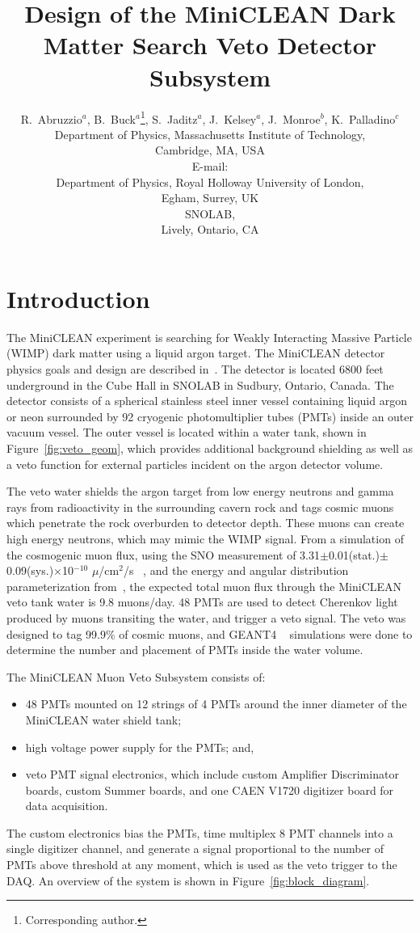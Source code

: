 \documentclass{JINST}
\title{Design of the MiniCLEAN Dark Matter Search Veto Detector Subsystem}
\author{R.~Abruzzio$^a$, B.~Buck$^a$\thanks{Corresponding author.}, S.~Jaditz$^a$, J.~Kelsey$^a$, J.~Monroe$^{b}$, K.~Palladino$^{c}$\\
\llap{$^a$}Department of Physics, Massachusetts Institute of Technology,\\
	Cambridge, MA, USA\\
	E-mail: \email{bbuck@mit.edu}\\
\llap{$^b$}Department of Physics, Royal Holloway University of London,\\
	Egham, Surrey, UK \\
\llap{$^c$}SNOLAB, \\ 
        Lively, Ontario, CA}
\begin{document}
\section{Introduction}
\label{Introduction}
The MiniCLEAN experiment is searching for Weakly Interacting Massive Particle
(WIMP) dark matter using a liquid argon target.  The MiniCLEAN detector
physics goals and design are described in~\cite{ref:miniclean_physics}.  The
detector is located 6800 feet underground in the Cube Hall in SNOLAB in
Sudbury, Ontario, Canada.  The detector consists of a spherical stainless
steel inner vessel containing liquid argon or neon surrounded by 92 cryogenic
photomultiplier tubes (PMTs) inside an outer vacuum vessel. The outer vessel
is located within a water tank, shown in Figure~\ref{fig:veto_geom}, which
provides additional background shielding as well as a veto function for
external particles incident on the argon detector volume.  

The veto water shields the argon target from low energy neutrons and gamma
rays from radioactivity in the surrounding cavern rock and tags cosmic muons
which penetrate the rock overburden to detector depth.  These muons can
create high energy neutrons, which may mimic the WIMP signal.
From a simulation of the cosmogenic muon flux, using the SNO measurement of
3.31$\pm$0.01(stat.)$\pm$0.09(sys.)$\times$10$^{-10}$ $\mu$/cm$^2$/s
~\cite{ref:sno_muon_flux}, and the energy and angular distribution
parameterization from~\cite{ref:mei_and_hime}, the expected total muon flux
through the MiniCLEAN veto tank water is 9.8 muons/day.  48 PMTs are used to
detect Cherenkov light produced by muons transiting the water, and trigger a
veto signal.  The veto was designed to tag 99.9\% of cosmic muons, and GEANT4
~\cite{ref:geant4} simulations were done to determine the number and placement
of PMTs inside the water volume.  

The MiniCLEAN Muon Veto Subsystem consists of:
\begin{itemize}
\item 48 PMTs mounted on 12 strings of 4 PMTs around the inner diameter of the MiniCLEAN water shield tank;
\item high voltage power supply for the PMTs; and,
\item veto PMT signal electronics, which include custom Amplifier Discriminator boards, custom Summer boards, and one CAEN V1720 digitizer board for data acquisition.  
\end{itemize}
The custom electronics bias the PMTs, time multiplex 8 PMT channels into a
single digitizer channel, and generate a signal proportional to the number
of PMTs above threshold at any moment, which is used as the veto trigger to
the DAQ.  An overview of the system is shown in
Figure~\ref{fig:block_diagram}.
\end{document}
